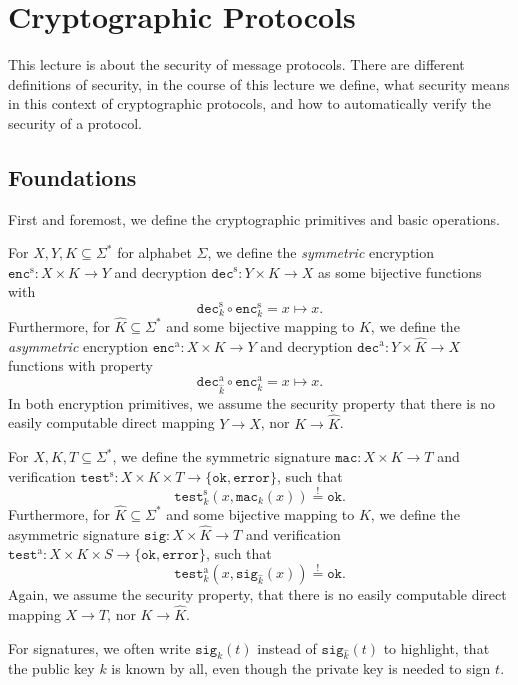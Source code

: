 \chapter{Cryptographic Protocols}
This lecture is about the security of message protocols.
There are different definitions of security, in the course of this lecture we define, what security means in this context of cryptographic protocols, and how to automatically verify the security of a protocol.

\section{Foundations}
First and foremost, we define the cryptographic primitives and basic operations.

\newcommand{\encs}{\texttt{enc}^\text{s}}
\newcommand{\enca}{\texttt{enc}^\text{a}}
\newcommand{\decs}{\texttt{dec}^\text{s}}
\newcommand{\deca}{\texttt{dec}^\text{a}}
\begin{definition}\label{def:encryption}
    For \(X,Y,K \subseteq \Sigma^*\) for alphabet \(\Sigma\), we define the \emph{symmetric} encryption \(\encs : X \times K \rightarrow Y\) and decryption \(\decs : Y \times K \rightarrow X\) as some bijective functions with
    \[\decs_k \circ \encs_k = x \mapsto x.\]
    Furthermore, for \(\hat K \subseteq \Sigma^*\) and some bijective mapping to \(K\), we define the \emph{asymmetric} encryption \(\enca : X \times K \rightarrow Y\) and decryption \(\deca : Y \times \hat K \rightarrow X\) functions with property
    \[\deca_{\hat{k}} \circ \enca_{k} = x \mapsto x.\]
    In both encryption primitives, we assume the security property that there is no easily computable direct mapping \(Y \rightarrow X\), nor \(K \rightarrow \hat K\).

\end{definition}

\newcommand{\mac}{\texttt{mac}}
\newcommand{\tests}{\texttt{test}^\text{s}}
\newcommand{\testa}{\texttt{test}^\text{a}}
\newcommand{\ok}{\texttt{ok}}
\newcommand{\err}{\texttt{error}}
\newcommand{\sig}{\texttt{sig}}
\begin{definition}
    For \(X,K,T \subseteq \Sigma^*\), we define the symmetric signature \(\mac : X \times K \rightarrow T\) and verification \(\tests : X \times K \times T \rightarrow \{\ok, \err\}\), such that
    \[\tests_k(x, \mac_k(x)) \overset{!}{=} \ok.\]
    Furthermore, for \(\hat K \subseteq \Sigma^*\) and some bijective mapping to \(K\), we define the asymmetric signature \(\sig : X \times \hat K \rightarrow T\) and verification \(\testa : X \times K \times S \rightarrow \{\ok, \err\}\), such that
    \[\testa_k(x, \sig_{\hat{k}}(x)) \overset{!}{=} \ok.\]
    Again, we assume the security property, that there is no easily computable direct mapping \(X \rightarrow T\), nor \(K \rightarrow \hat K\).

    For signatures, we often write \(\sig_k(t)\) instead of \(\sig_{\hat k}(t)\) to highlight, that the public key \(k\) is known by all, even though the private key is needed to sign \(t\).
\end{definition}

